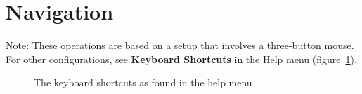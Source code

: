 \documentclass[fleqn,11pt,openany]{book}
\begin{document}
\section{Navigation}

Note: These operations are based on a setup that involves a three-button mouse. For other configurations, see {\bf Keyboard Shortcuts} in the Help menu (figure~\ref{fig:KeyboardShortcuts}).

\begin{figure}
\caption{The keyboard shortcuts as found in the help menu}\label{fig:KeyboardShortcuts}
\end{figure}
\end{document}
